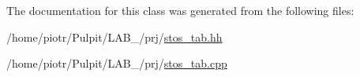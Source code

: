 \-The documentation for this class was generated from the following files\-:\begin{DoxyCompactItemize}
\item 
/home/piotr/\-Pulpit/\-L\-A\-B\-\_/prj/\hyperlink{stos__tab_8hh}{stos\-\_\-tab.\-hh}\item 
/home/piotr/\-Pulpit/\-L\-A\-B\-\_/prj/\hyperlink{stos__tab_8cpp}{stos\-\_\-tab.\-cpp}\end{DoxyCompactItemize}
